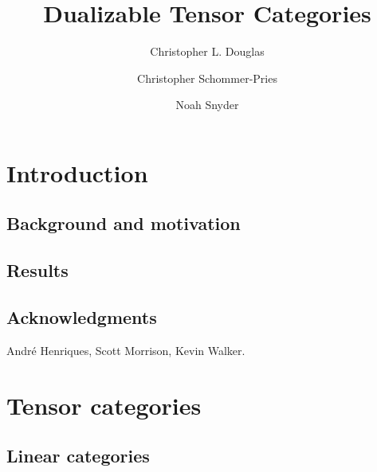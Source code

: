 \documentclass{amsart}
\begin{document}
\title{Dualizable Tensor Categories}

\begin{abstract}

\end{abstract}
	
\author{Christopher L. Douglas}
\address{Department of Mathematics, University of California, Berkeley, CA 94720, USA}
	
\author{Christopher Schommer-Pries}
\address{Department of Mathematics \\
} %

\author{Noah Snyder}
\address{}
\email{}

\maketitle	
\tableofcontents

\section{Introduction}
\subsection{Background and motivation}

\subsection{Results}

\subsection{Acknowledgments}
Andr\'e Henriques, Scott Morrison, Kevin Walker.


\section{Tensor categories}

\subsection{Linear categories}
\end{document}
